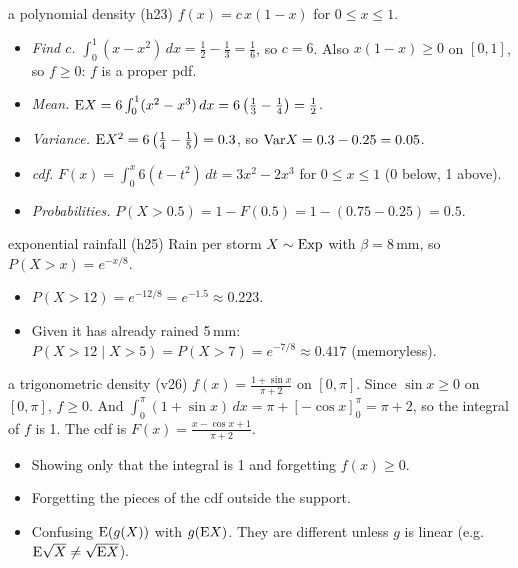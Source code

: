 \begin{example}{a polynomial density (h23)}
$f(x) = c\,x(1-x)$ for $0 \le x \le 1$.
\begin{itemize}
  \item \emph{Find $c$.} $\int_0^1 (x - x^2)\,dx = \frac12-\frac13 = \frac16$, so $c = 6$. Also $x(1-x)\ge 0$ on $[0,1]$, so $f\ge 0$: $f$ is a proper pdf.
  \item \emph{Mean.} $\mathrm{E} X = 6\int_0^1 (x^2 - x^3)\,dx = 6\left(\frac13-\frac14\right) = \frac12$.
  \item \emph{Variance.} $\mathrm{E} X^2 = 6\left(\frac14-\frac15\right) = 0.3$, so $\mathrm{Var} X = 0.3 - 0.25 = 0.05$.
  \item \emph{cdf.} $F(x) = \int_0^x 6(t-t^2)\,dt = 3x^2 - 2x^3$ for $0\le x\le 1$ (0 below, 1 above).
  \item \emph{Probabilities.} $P(X > 0.5) = 1 - F(0.5) = 1 - (0.75 - 0.25) = 0.5$.
\end{itemize}
\end{example}

\begin{example}{exponential rainfall (h25)}
Rain per storm $X \sim \mathrm{Exp}$ with $\beta = 8$\,mm, so $P(X > x) = e^{-x/8}$.
\begin{itemize}
  \item $P(X > 12) = e^{-12/8} = e^{-1.5} \approx 0.223$.
  \item Given it has already rained 5\,mm: $P(X > 12 \mid X > 5) = P(X > 7) = e^{-7/8} \approx 0.417$ (memoryless).
\end{itemize}
\end{example}

\begin{example}{a trigonometric density (v26)}
$f(x) = \frac{1+\sin x}{\pi+2}$ on $[0,\pi]$. Since $\sin x \ge 0$ on $[0,\pi]$, $f \ge 0$. And
$\int_0^\pi (1+\sin x)\,dx = \pi + [-\cos x]_0^\pi = \pi + 2$, so the integral of $f$ is 1. The cdf is
$F(x) = \frac{x - \cos x + 1}{\pi+2}$.
\end{example}

\begin{traps}
\begin{itemize}
  \item Showing only that the integral is 1 and forgetting $f(x)\ge 0$.
  \item Forgetting the pieces of the cdf outside the support.
  \item Confusing $\mathrm{E}(g(X))$ with $g(\mathrm{E} X)$. They are different unless $g$ is linear (e.g.\ $\mathrm{E}\sqrt X \neq \sqrt{\mathrm{E} X}$).
\end{itemize}
\end{traps}

